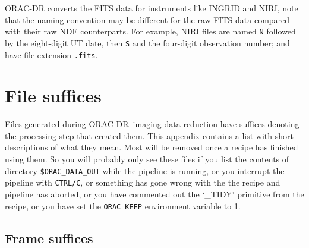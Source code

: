 \documentclass[twoside,11pt,nolof]{starlink}
\providecommand{\ORACDR}{{\footnotesize ORAC-DR}}
\begin{document}
ORAC-DR converts the FITS data for instruments like INGRID and NIRI,
note that the naming convention may be different for the raw FITS data
compared with their raw NDF counterparts.  For example, NIRI files
are named {\tt{N}} followed by the eight-digit UT date, then {\tt{S}} and
the four-digit observation number; and have file extension {\tt{.fits}}.

\newpage
\section{File suffices}\label{file_suffices}%

Files generated during \ORACDR\ imaging data reduction have suffices
denoting the processing step that created them.  This appendix
contains a list with short descriptions of what they mean.  Most will
be removed once a recipe has finished using them.  So you will
probably only see these files if you list the contents of directory
\texttt{\$ORAC\_DATA\_OUT} while the pipeline is running, or you interrupt the
pipeline with \texttt{CTRL/C}, or something has gone wrong with the the
recipe and pipeline has aborted, or you have commented out the `\_TIDY'
primitive from the recipe, or you have set the \texttt{ORAC\_KEEP} environment
variable to 1.

\subsection*{Frame suffices}%
\end{document}
